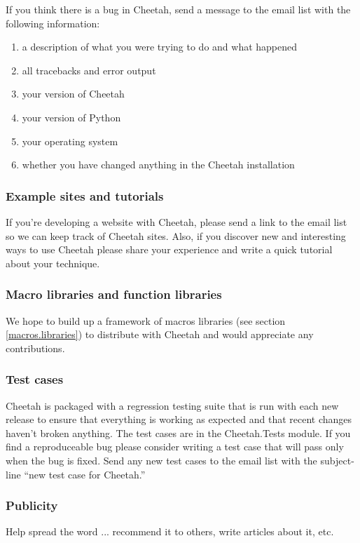 \begin{itemize}
If you think there is a bug in Cheetah, send a message to the email list
with the following information:

\begin{enumerate}
\item a description of what you were trying to do and what happened
\item all tracebacks and error output
\item your version of Cheetah
\item your version of Python
\item your operating system
\item whether you have changed anything in the Cheetah installation
\end{enumerate}

\subsubsection{Example sites and tutorials}
If you're developing a website with Cheetah, please send a link to the
email list so we can keep track of Cheetah sites.  Also, if you discover
new and interesting ways to use Cheetah please share your experience and
write a quick tutorial about your technique.

\subsubsection{Macro libraries and function libraries}
We hope to build up a framework of macros libraries (see section
\ref{macros.libraries}) to distribute with Cheetah and would appreciate
any contributions.

\subsubsection{Test cases}
Cheetah is packaged with a regression testing suite that is run with each
new release to ensure that everything is working as expected and that recent
changes haven't broken anything.  The test cases are in the Cheetah.Tests
module.  If you find a reproduceable bug please consider writing a test case
that will pass only when the bug is fixed.  Send any new test cases to the email
list with the subject-line ``new test case for Cheetah.''

\subsubsection{Publicity}
Help spread the word ... recommend it to others, write articles about it, etc.


\end{itemize}
